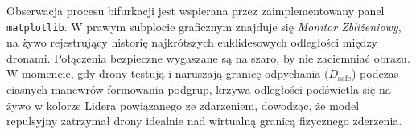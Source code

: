Obserwacja procesu bifurkacji jest wspierana przez zaimplementowany panel \texttt{matplotlib}. W prawym subplocie graficznym znajduje się \textit{Monitor Zbliżeniowy}, na żywo rejestrujący historię najkrótszych euklidesowych odległości między dronami. Połączenia bezpieczne wygaszane są na szaro, by nie zaciemniać obrazu. W momencie, gdy drony testują i naruszają granicę odpychania ($D_{\text{safe}}$) podczas ciasnych manewrów formowania podgrup, krzywa odległości podświetla się na żywo w kolorze Lidera powiązanego ze zdarzeniem, dowodząc, że model repulsyjny zatrzymał drony idealnie nad wirtualną granicą fizycznego zderzenia.